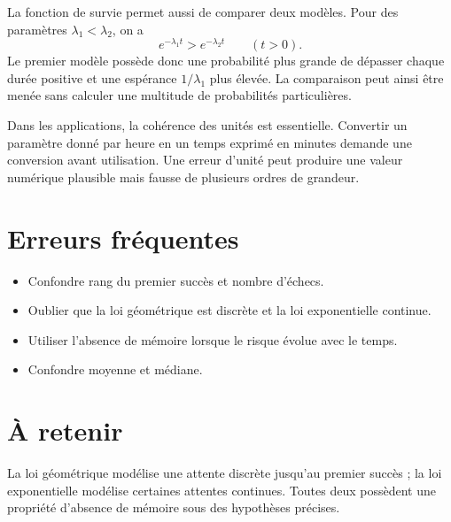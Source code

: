 La fonction de survie permet aussi de comparer deux modèles. Pour des paramètres $\lambda_1<\lambda_2$, on a
\[
e^{-\lambda_1 t}>e^{-\lambda_2 t}\qquad(t>0).
\]
Le premier modèle possède donc une probabilité plus grande de dépasser chaque durée positive et une espérance $1/\lambda_1$ plus élevée. La comparaison peut ainsi être menée sans calculer une multitude de probabilités particulières.

Dans les applications, la cohérence des unités est essentielle. Convertir un paramètre donné par heure en un temps exprimé en minutes demande une conversion avant utilisation. Une erreur d'unité peut produire une valeur numérique plausible mais fausse de plusieurs ordres de grandeur.

\section{Erreurs fréquentes}
\begin{itemize}
\item Confondre rang du premier succès et nombre d'échecs.
\item Oublier que la loi géométrique est discrète et la loi exponentielle continue.
\item Utiliser l'absence de mémoire lorsque le risque évolue avec le temps.
\item Confondre moyenne et médiane.
\end{itemize}
\section{À retenir}
\begin{aretenir}
La loi géométrique modélise une attente discrète jusqu'au premier succès ; la loi exponentielle modélise certaines attentes continues. Toutes deux possèdent une propriété d'absence de mémoire sous des hypothèses précises.
\end{aretenir}
